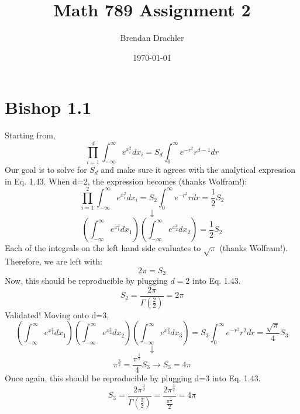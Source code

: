 \documentclass[12pt, letterpaper]{article}
\title{Math 789 Assignment 2}
\author{Brendan Drachler}
\date{\today}
\begin{document}
\begin{titlepage}
\maketitle
\end{titlepage}
\section*{Bishop 1.1}
Starting from, 
\begin{equation}
\prod_{i=1}^{d} \int_{-\infty}^{\infty} e^{x_{i}^{2}} dx_i = S_d \int_{0}^{\infty} e^{-r^2} r^{d-1} dr
\end{equation}
Our goal is to solve for $S_d$ and make sure it agrees with the analytical expression in Eq. 1.43. When d=2, the expression becomes (thanks Wolfram!):
\begin{equation}
\prod_{i=1}^{2} \int_{-\infty}^{\infty} e^{x_{i}^{2}} dx_i = S_2 \int_{0}^{\infty} e^{-r^2} r dr =  \frac{1}{2} S_2 
\end{equation}
\begin{equation}
\downarrow
\end{equation}
\begin{equation}
( \int_{-\infty}^{\infty} e^{x_{1}^{2}} dx_1) ( \int_{-\infty}^{\infty} e^{x_{2}^{2}} dx_2 ) = \frac{1}{2} S_2 
\end{equation}
Each of the integrals on the left hand side evaluates to $\sqrt{\pi}$ (thanks Wolfram!). Therefore, we are left with:
\begin{equation}
2 \pi = S_2
\end{equation}
Now, this should be reproducible by plugging $d=2$ into Eq. 1.43.
\begin{equation}
S_2 = \frac{2 \pi}{\Gamma(\frac{2}{2})} = 2 \pi
\end{equation}
Validated! Moving onto d=3, 
\begin{equation}
( \int_{-\infty}^{\infty} e^{x_{1}^{2}} dx_1) ( \int_{-\infty}^{\infty} e^{x_{2}^{2}} dx_2 )( \int_{-\infty}^{\infty} e^{x_{3}^{2}} dx_3 ) =  S_3 \int_{0}^{\infty} e^{-r^2} r^2 dr = \frac{\sqrt{\pi}}{4} S_3 
\end{equation}
\begin{equation}
\downarrow
\end{equation}
\begin{equation}
\pi^{\frac{3}{2}}= \frac{\pi^{\frac{1}{2}}}{4} S_3 \rightarrow S_3 = 4 \pi
\end{equation}
Once again, this should be reproducible by plugging d=3 into Eq. 1.43. 
\begin{equation}
S_3 = \frac{2 \pi^{\frac{3}{2}}}{\Gamma(\frac{3}{2})} = \frac{2 \pi^{\frac{3}{2}}}{\frac{\pi^{\frac{1}{2}}}{2}} = 4 \pi
\end{equation}
\end{document}
